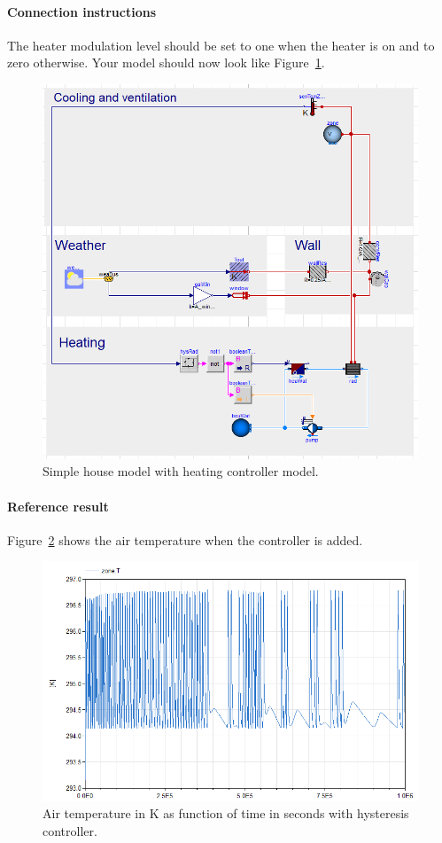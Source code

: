 \documentclass[10pt,a4paper]{article}
\begin{document}
\paragraph{Connection instructions}
The heater modulation level should be set to one when
the heater is on and to zero otherwise. Your model should now
look like Figure~\ref{fig:heatingControllerModel}.

\begin{figure}[h!]
\centering
\includegraphics[scale=0.4]{heatingControllerModel.png}
\caption{Simple house model with heating controller model.}
\label{fig:heatingControllerModel}
\end{figure} 


\paragraph{Reference result}
Figure~\ref{fig:res5} shows the air temperature when
the controller is added.



\begin{figure}
\centering
\includegraphics[scale=0.6]{result5.png}
\caption{Air temperature in K as function of time in seconds with hysteresis controller.}
\label{fig:res5}
\end{figure}
\end{document}
